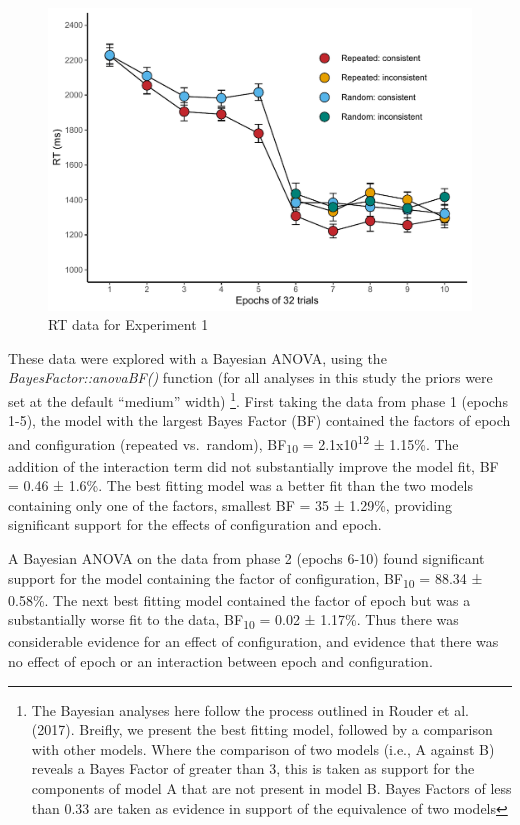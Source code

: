 \documentclass[
  man,floatsintext]{apa7}
\begin{document}
\begin{figure}

{\centering \includegraphics{CCC_ms1_files/figure-latex/Exp1-RT-figure-1} 

}

\caption{RT data for Experiment 1}\label{fig:Exp1-RT-figure}
\end{figure}

These data were explored with a Bayesian ANOVA, using the \emph{BayesFactor::anovaBF()} function (for all analyses in this study the priors were set at the default ``medium'' width) \footnote{The Bayesian analyses here follow the process outlined in Rouder et al. (2017). Breifly, we present the best fitting model, followed by a comparison with other models. Where the comparison of two models (i.e., A against B) reveals a Bayes Factor of greater than 3, this is taken as support for the components of model A that are not present in model B. Bayes Factors of less than 0.33 are taken as evidence in support of the equivalence of two models}. First taking the data from phase 1 (epochs 1-5), the model with the largest Bayes Factor (BF) contained the factors of epoch and configuration (repeated vs.~random), BF\textsubscript{10} = 2.1x10\textsuperscript{12} ± 1.15\%. The addition of the interaction term did not substantially improve the model fit, BF = 0.46 ± 1.6\%. The best fitting model was a better fit than the two models containing only one of the factors, smallest BF = 35 ± 1.29\%, providing significant support for the effects of configuration and epoch.

A Bayesian ANOVA on the data from phase 2 (epochs 6-10) found significant support for the model containing the factor of configuration, BF\textsubscript{10} = 88.34 ± 0.58\%. The next best fitting model contained the factor of epoch but was a substantially worse fit to the data, BF\textsubscript{10} = 0.02 ± 1.17\%. Thus there was considerable evidence for an effect of configuration, and evidence that there was no effect of epoch or an interaction between epoch and configuration.
\end{document}
